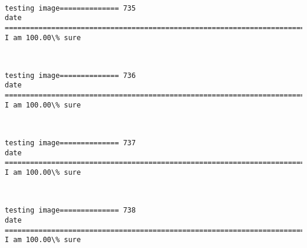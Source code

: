 \documentclass[11pt]{article}
\begin{document}
    \begin{center}
    \end{center}
    { \hspace*{\fill} \\}
    
    \begin{Verbatim}[commandchars=\\\{\}]
testing image============== 735
date
============================================================================
I am 100.00\% sure

    \end{Verbatim}

    \begin{center}
    \end{center}
    { \hspace*{\fill} \\}
    
    \begin{Verbatim}[commandchars=\\\{\}]
testing image============== 736
date
============================================================================
I am 100.00\% sure

    \end{Verbatim}

    \begin{center}
    \end{center}
    { \hspace*{\fill} \\}
    
    \begin{Verbatim}[commandchars=\\\{\}]
testing image============== 737
date
============================================================================
I am 100.00\% sure

    \end{Verbatim}

    \begin{center}
    \end{center}
    { \hspace*{\fill} \\}
    
    \begin{Verbatim}[commandchars=\\\{\}]
testing image============== 738
date
============================================================================
I am 100.00\% sure

    \end{Verbatim}
\end{document}
